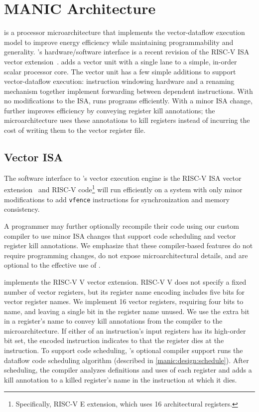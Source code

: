 \section{MANIC Architecture}
\label{manic:manic}
\manic is a processor microarchitecture that implements the
vector-dataflow execution model to improve energy efficiency while
maintaining programmability and generality.
%
\manic's hardware/software interface is a recent revision of the RISC-V
ISA vector extension~\cite{riscv_2019}.
%
\manic adds a vector unit with a single lane to a simple, in-order scalar processor core.
%
The vector unit has a few simple additions to support vector-dataflow execution: instruction windowing hardware and a renaming mechanism together implement
forwarding between dependent instructions.
%
With no modifications to the ISA, \manic runs programs efficiently.  With a
minor ISA change, \manic further improves efficiency by conveying register kill
annotations; the microarchitecture uses these annotations to
kill registers instead of incurring the cost of writing them to the vector
register file. 

\subsection{Vector ISA}
\label{manic:manic:isa}
The software interface to \manic's vector execution engine is the RISC-V ISA
vector extension~\cite{riscv_2019} and RISC-V code\footnote{Specifically, RISC-V E extension, which uses 16 architectural registers.} will run efficiently on a \manic
system with only minor modifications to add {\tt vfence} instructions for synchronization and  memory consistency. 

A programmer may further optionally recompile their code using our custom \manic
compiler to use minor ISA changes that support code scheduling and vector
register kill annotations.  We emphasize that these compiler-based features do
not require programming changes, do not expose microarchitectural details, and
are optional to the effective use of \manic.%

\manic implements the RISC-V V vector extension. RISC-V V does not specify a
fixed number of vector registers, but its register name encoding includes five
bits for vector register names.  We implement 16 vector registers, requiring
four bits to name, and leaving a single bit in the register name unused.
We use the extra bit in a register's name to convey kill annotations from the
compiler to the microarchitecture.  If either of an instruction's input
registers has its high-order bit set, the encoded instruction indicates to
\manic that the register dies at the instruction.
%
To support code scheduling, \manic's optional compiler support runs the
dataflow code scheduling algorithm (described in \autoref{manic:design:schedule}).
%
After scheduling, the compiler analyzes definitions and uses of each register
and adds a kill annotation to a killed register's name in the instruction 
at which it dies. 

